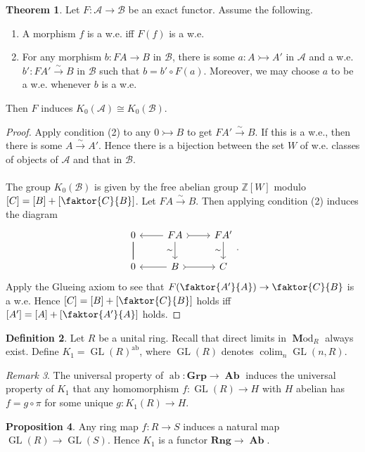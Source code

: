 \documentclass[10pt,letterpaper,cm]{nupset}
\theoremstyle{definition}
\newtheorem{definition}{Definition}
\theoremstyle{theorem}
\newtheorem{theorem}[definition]{Theorem}
\newtheorem{prop}[definition]{Proposition}
\theoremstyle{remark}
\newtheorem{remark}[definition]{Remark}
\newcommand{\Z}{\mathbb Z}
\newcommand{\1}{\mathbf{1}}
\renewcommand{\a}{\mathscr{A}}
\renewcommand{\b}{\mathscr{B}}
\newcommand{\0}{\vec 0}
\DeclareMathOperator*{\GL}{GL}
\DeclareMathOperator{\ab}{ab}
\DeclareMathOperator{\colim}{colim}
\DeclareMathOperator{\Ab}{\mathbf{Ab}}
\DeclareMathOperator{\Mod}{\mathbf Mod}
\begin{document}
\begin{theorem}
Let $F : \a \to \b$ be an exact functor. Assume the following.
\begin{enumerate}
\item A morphism $f$ is a w.e. iff $F(f)$ is a w.e.
\item For any morphism $b : FA \to B$ in $\b$, there is some $a: A \rightarrowtail A'$ in $\a$ and a w.e. $b' : FA' \overset{\sim}{\longrightarrow} B$ in $\b$ such that $b = b' \circ F(a)$. Moreover, we may choose $a$ to be a w.e. whenever $b$ is a w.e.
\end{enumerate}
Then $F$ induces $K_0(\a) \cong K_0(\b)$.
\end{theorem}
\begin{proof}
Apply condition (2) to any $0 \rightarrowtail B$ to get $FA' \overset{\sim}{\longrightarrow} B$. If this is a w.e., then there is some $A \overset{\sim}{\longrightarrow} A'$. Hence there is a bijection between the set $W$ of w.e. classes of objects of $\a$ and that in $\b$. \\ \\ The group $K_0(\b)$ is given by the free abelian group $\Z[W]$ modulo $[C] = [B] + [\faktor{C}{B}]$. Let $FA \overset{\sim}{\longrightarrow}  B$. Then applying condition (2) induces the diagram
\[
\begin{tikzcd}
0 \arrow[d, no head] \arrow[d, no head] & FA \arrow[d, "\sim"'] \arrow[r, tail] \arrow[l] & FA' \arrow[d, "\sim"'] \\
0 & B \arrow[r, tail] \arrow[l] & C
\end{tikzcd}.
\]
Apply the Glueing axiom to see that $F(\faktor{A'}{A}) \to \faktor{C}{B}$ is a w.e. Hence $[C] = [B] + [\faktor{C}{B}]$
 holds iff $[A'] = [A] + [\faktor{A'}{A}]$ holds.
\end{proof}


\begin{definition}
Let $R$ be a unital ring. Recall that direct limits in $\Mod_R$ always exist. Define $K_1 = \GL(R)^{\ab}$, where $\GL(R)$ denotes $\colim_n \GL(n, R)$.
\end{definition}

\begin{remark}
The universal property of $\ab: \mathbf{Grp} \to \Ab$ induces the universal property of $K_1$ that any homomorphism $f: \GL(R) \to H$ with $H$ abelian has $f = g \circ \pi$ for some unique $g: K_1(R) \to H$.
\end{remark}

\begin{prop}
Any ring map $f: R \to S$ induces a natural map $\GL(R) \to \GL(S)$. Hence $K_1$ is a functor $\mathbf{Rng} \to \Ab$.
\end{prop}
\end{document}
